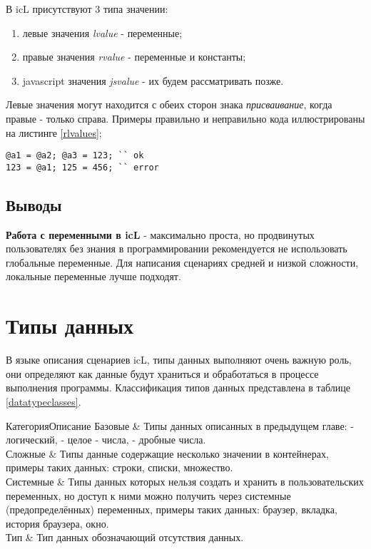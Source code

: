 \documentclass[a4paper, 14pt]{extarticle}
\newenvironment{icEnum}
	{ \begin{enumerate}[noitemsep,nolistsep] }
	{ \end{enumerate} }
\begin{document}
	В icL присутствуют 3 типа значении:
\begin{icEnum}
	\item левые значения {\it lvalue} - переменные;
	\item правые значения {\it rvalue} - переменные и константы;
	\item javascript значения {\it jsvalue} - их будем рассматривать позже.
\end{icEnum}
	
	Левые значения могут находится с обеих сторон знака {\it присваивание}, когда правые - только справа. Примеры правильно и неправильно кода иллюстрированы на листинге \ref{rlvalues};
\begin{lstlisting}[caption=Левые и правые значения, label=rlvalues]
@a1 = @a2; @a3 = 123; `` ok
123 = @a1; 125 = 456; `` error 
\end{lstlisting}

\subsection{Выводы}

	{\bf Работа с переменными в icL} - максимально проста, но продвинутых пользователях без знания в программировании рекомендуется не использовать глобальные переменные. Для написания сценариях средней и низкой сложности, локальные переменные лучше подходят. 

\section{Типы данных}

	В языке описания сценариев icL, типы данных выполняют очень важную роль, они определяют как данные будут храниться и обработаться в процессе выполнения программы. Классификация типов данных представлена в таблице \ref{datatypeclasses}.
	
	{Категория}{Описание}
	{
	Базовые & Типы данных описанных в предыдущем главе:  - логический,  - целое - числа,  - дробные числа. \\ \hline
	Сложные & Типы данные содержащие несколько значении в контейнерах, примеры таких данных: строки, списки, множество. \\ \hline
	Системные & Типы данных которых нельзя создать и хранить в пользовательских переменных, но доступ к ними можно получить через системные (предопределённых) переменных, примеры таких данных: браузер, вкладка, история браузера, окно. \\ \hline
	Тип  & Тип данных обозначающий отсутствия данных.
	}
	
\end{document}
